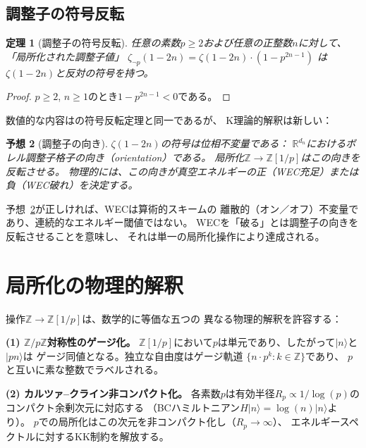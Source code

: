 \documentclass[11pt,a4paper]{article}
\newtheorem{theorem}{定理}
\newtheorem{conjecture}[theorem]{予想}
\newcommand{\Zp}{\mathbb{Z}[1/p]}
\begin{document}
\subsection{調整子の符号反転}

\begin{theorem}[調整子の符号反転]
\label{thm:reg_flip}
任意の素数$p \geq 2$および任意の正整数$n$に対して、
「局所化された調整子値」
$\zeta_{\neg p}(1-2n) = \zeta(1-2n) \cdot (1 - p^{2n-1})$
は$\zeta(1-2n)$と反対の符号を持つ。
\end{theorem}

\begin{proof}
$p \geq 2$, $n \geq 1$のとき$1 - p^{2n-1} < 0$である。
\end{proof}

数値的な内容は\cite{paper_A}の符号反転定理と同一であるが、
K理論的解釈は新しい：

\begin{conjecture}[調整子の向き]
\label{conj:reg}
$\zeta(1-2n)$の符号は位相不変量である：
$\mathbb{R}^{d_n}$におけるボレル調整子格子の\emph{向き}（orientation）である。
局所化$\mathbb{Z} \to \Zp$はこの向きを反転させる。
物理的には、この向きが真空エネルギーの正（WEC充足）または
負（WEC破れ）を決定する。
\end{conjecture}

予想~\ref{conj:reg}が正しければ、WECは算術的スキームの
離散的（オン／オフ）不変量であり、連続的なエネルギー閾値ではない。
WECを「破る」とは調整子の向きを反転させることを意味し、
それは単一の局所化操作により達成される。

\section{局所化の物理的解釈}
\label{sec:physics}

操作$\mathbb{Z} \to \Zp$は、数学的に等価な五つの
異なる物理的解釈を許容する：

\textbf{(1) $\mathbb{Z}/p\mathbb{Z}$対称性のゲージ化。}
$\Zp$において$p$は単元であり、したがって$|n\rangle$と$|pn\rangle$は
ゲージ同値となる。独立な自由度はゲージ軌道
$\{n \cdot p^k : k \in \mathbb{Z}\}$であり、
$p$と互いに素な整数でラベルされる。

\textbf{(2) カルツァ--クライン非コンパクト化。}
各素数$p$は有効半径$R_p \propto 1/\log(p)$の
コンパクト余剰次元に対応する
（BCハミルトニアン$H|n\rangle = \log(n)|n\rangle$より）。
$p$での局所化はこの次元を非コンパクト化し（$R_p \to \infty$）、
エネルギースペクトルに対するKK制約を解放する。
\end{document}
